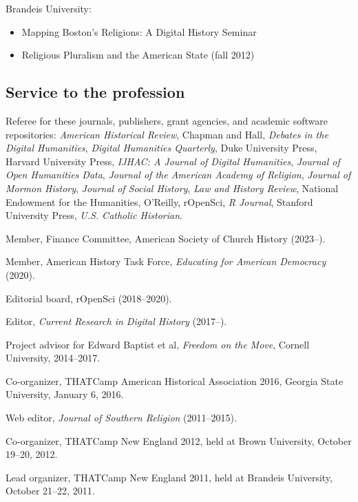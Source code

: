 \documentclass[11pt]{article}
\providecommand{\tightlist}{%
  \setlength{\itemsep}{0pt}\setlength{\parskip}{0pt}}
\begin{document}
\vspace{-0.1in}

Brandeis University:

\vspace{-0.15in}

\begin{itemize}
    \tightlist
  \item
    Mapping Boston's Religions: A Digital History Seminar 
  \item
    Religious Pluralism and the American State (fall 2012)
\end{itemize}

\subsection{Service to the profession}\label{Service to the profession}

Referee for these journals, publishers, grant agencies, and academic software repositories: \emph{American Historical Review}, Chapman and Hall, \emph{Debates in the Digital Humanities}, \emph{Digital Humanities Quarterly}, Duke University Press, Harvard University Press, \emph{IJHAC: A Journal of Digital Humanities}, \emph{Journal of Open Humanities Data}, \emph{Journal of the American Academy of Religion}, \emph{Journal of Mormon History}, \emph{Journal of Social History}, \emph{Law and History Review}, National Endowment for the Humanities, O'Reilly, rOpenSci, \emph{R Journal}, Stanford University Press, \emph{U.S. Catholic Historian}.

Member, Finance Committee, American Society of Church History (2023--).

Member, American History Task Force, \emph{Educating for American Democracy} (2020).

Editorial board, rOpenSci (2018--2020).

Editor, \emph{Current Research in Digital History} (2017--).

Project advisor for Edward Baptist et al, \emph{Freedom on the Move}, Cornell University, 2014--2017.

Co-organizer, THATCamp American Historical Association 2016, Georgia State University, January 6, 2016.

Web editor, \emph{Journal of Southern Religion} (2011--2015).

Co-organizer, THATCamp New England 2012, held at Brown University, October 19--20, 2012.

Lead organizer, THATCamp New England 2011, held at Brandeis University, October 21--22, 2011.
\end{document}
